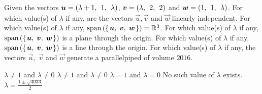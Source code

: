 
\begin{Exercise}[
name={},
title={}, 
difficulty=0,
origin={\cite{YL}}]
Given the vectors $\vec{u} = \rowvec{\lambda + 1,& 1,& \lambda}$, $\vec{v} = \rowvec{\lambda,& 2,& 2}$ and $\vec{w} = \rowvec{1,& 1,& \lambda}$.
\Question For which value(s) of $\lambda$ if any, are the vectors $\vec{u}, \vec{v}$ and $\vec{w}$ linearly independent.
\Question For which value(s) of $\lambda$ if any, $\text{span}\left(\mbox{$\left\{\hspace{0.1em}\bm{u},\;\bm{v},\;\bm{w}\hspace{0.1em}\right\}$}\right)=\mathbb{R}^3$.
\Question For which value(s) of $\lambda$ if any, $\text{span}\left(\mbox{$\left\{\hspace{0.1em}\bm{u},\;\bm{v},\;\bm{w}\hspace{0.1em}\right\}$}\right)$ is a plane through the origin.
\Question For which value(s) of $\lambda$ if any, $\text{span}\left(\mbox{$\left\{\hspace{0.1em}\bm{u},\;\bm{v},\;\bm{w}\hspace{0.1em}\right\}$}\right)$ is a line through the origin.
\Question For which value(s) of $\lambda$ if any, the vectors $\vec{u},\; \vec{v}$ and $\vec{w}$ generate a parallelpiped of volume $2016$.
\end{Exercise}

\begin{Answer}
\Question $\lambda\neq1$ and $\lambda\neq0$
\Question $\lambda\neq1$ and $\lambda\neq0$
\Question $\lambda=1$ and $\lambda=0$
\Question No such value of $\lambda$ exists.
\Question $\lambda=\frac{1\pm\sqrt{4033}}{2}$
\end{Answer}
